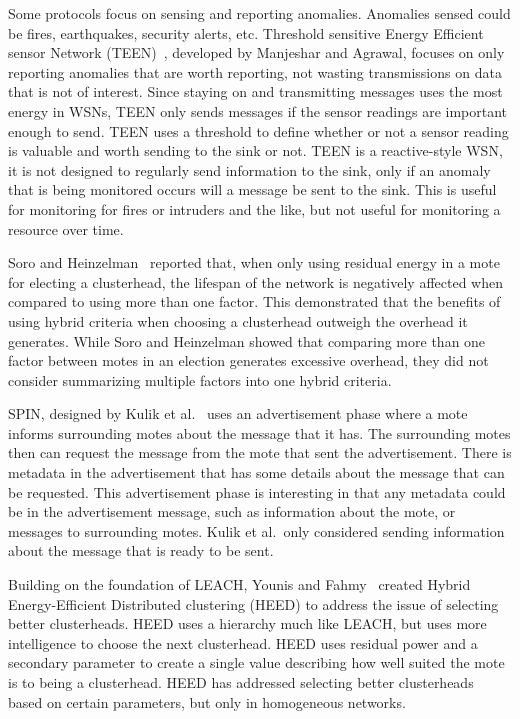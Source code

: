Some protocols focus on sensing and reporting anomalies. Anomalies sensed
could be fires, earthquakes, security alerts, etc. Threshold sensitive Energy Efficient 
sensor Network (TEEN)~\cite{teen}, developed by Manjeshar and Agrawal, focuses on 
only reporting anomalies that are worth reporting, not wasting transmissions
on data that is not of interest. Since staying on and transmitting messages uses 
the most energy in WSNs, TEEN only sends messages if the sensor readings are
important enough to send. TEEN uses a threshold to define whether or not a
sensor reading is valuable and worth sending to the sink or not.
TEEN is a reactive-style WSN, it is not designed to regularly send information to the
sink, only if an anomaly that is being monitored occurs will a 
message be sent to the sink. This is useful for monitoring for fires or 
intruders and the like, but not useful for monitoring a resource over time.


Soro and Heinzelman~\cite{coveragepreservation} reported that, when only using 
residual energy in a mote for electing a clusterhead, the lifespan of the 
network is negatively affected when compared to using more than one factor. 
This demonstrated that the benefits of using hybrid criteria when choosing a 
clusterhead outweigh the overhead it generates. While Soro and Heinzelman showed that 
comparing more than one factor between motes in an election generates 
excessive overhead, they did not consider summarizing multiple factors into 
one hybrid criteria.

SPIN, designed by Kulik et al.~\cite{spin} uses an advertisement phase
where a mote informs surrounding motes about the message that it has. The surrounding
motes then can request the message from the mote that sent the advertisement. 
There is metadata in the advertisement that has some details about the message
that can be requested. This advertisement phase is interesting in that
any metadata could be in the advertisement message, such as information
about the mote, or messages to surrounding motes. Kulik et al.\ only considered 
sending information about the message that is ready to be sent.

Building on the foundation of LEACH, Younis and Fahmy~\cite{heed}  created 
Hybrid Energy-Efficient Distributed clustering (HEED) to address the issue of 
selecting better clusterheads. HEED uses a hierarchy much like LEACH, but uses 
more intelligence to choose the next clusterhead.  HEED uses residual power 
and a secondary parameter to create a single value describing how  well suited 
the mote is to being a clusterhead. HEED has addressed selecting better 
clusterheads based on certain parameters, but only in homogeneous networks.

